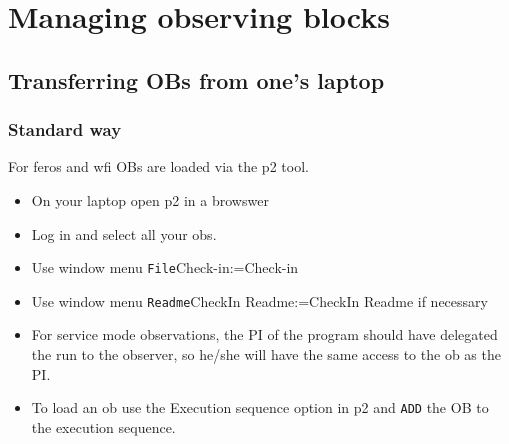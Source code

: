\documentclass[11pt,fleqn,a4paper]{book}
\makeatletter
\def\menu#1#2{\texttt{#1}\ifx{}#2\else\@for\@x:=#2\do{$\rightarrow$\texttt{\@x}}\fi}
\def\wmenu#1#2{window menu \menu{#1}{#2}}
\makeatother
\begin{document}

\chapter{Managing observing blocks}
\label{chap:ob}

\section{Transferring OBs from one's laptop}

\subsection{Standard way}
 For \gls{feros} and \gls{wfi} OBs are loaded via the p2 tool.
 
\begin{itemize}
    \item On your laptop open \gls{p2} in a browswer
    \item Log in and select all your \glspl{ob}.
    \item Use \wmenu{File}{Check-in}
    \item Use \wmenu{Readme}{CheckIn Readme} if necessary
    \item For service mode observations, the PI of the program should have delegated the run to the observer, so he/she will have the same access to the \gls{ob} as the PI.
    \item To load an \gls{ob} use the Execution sequence option in \gls{p2} and \texttt{ADD} the OB to the execution sequence.
\end{itemize}
\end{document}
